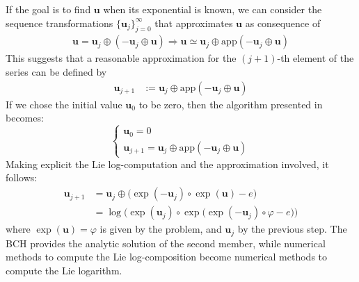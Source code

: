 If the goal is to find $\mathbf{u}$ when its exponential is known, we can consider the sequence transformations $\{\mathbf{u}_{j}  \}_{j=0}^{\infty}$ that approximates $\mathbf{u}$ as consequence of
\begin{align*}
\mathbf{u} = \mathbf{u}_{j} \oplus  (-\mathbf{u}_{j}  \oplus  \mathbf{u} ) \Longrightarrow
\mathbf{u} \simeq \mathbf{u}_{j} \oplus  \text{app}(-\mathbf{u}_{j}  \oplus  \mathbf{u} )
\end{align*}
This suggests that a reasonable approximation for the $(j+1)$-th element of the series can be defined by
\begin{align*}
\mathbf{u}_{j+1} & :=  \mathbf{u}_{j} \oplus  \text{app}(-\mathbf{u}_{j}  \oplus  \mathbf{u} )
\end{align*}
If we chose the initial value $\mathbf{u}_{0}$ to be zero, then the algorithm presented in \cite{Bossa:08}  becomes:
\begin{equation}\label{eq:bossa_reformulated}
\begin{cases}
\mathbf{u}_0 = 0 \\
\mathbf{u}_{j+1} = \mathbf{u}_{j} \oplus  \text{app}(-\mathbf{u}_{j}  \oplus  \mathbf{u} )
\end{cases}
\end{equation}
Making explicit the Lie log-computation and the approximation involved, it follows:
\begin{align}
\mathbf{u}_{j+1} 
&=
\mathbf{u}_{j} \oplus \big( \exp(-\mathbf{u}_{j})  \circ   \exp(\mathbf{u}) - e \big)\\
&=
 \log\Big( \exp( \mathbf{u}_{j}) \circ \exp \big( \exp(-\mathbf{u}_{j})  \circ  \varphi - e \big) \Big)
\end{align}
where $\exp(\mathbf{u}) = \varphi$ is given by the problem, and $\mathbf{u}_{j}$ by the previous step. The BCH provides the analytic solution of the second member, while 
numerical methods to compute the Lie log-composition become numerical methods to compute the Lie logarithm.

